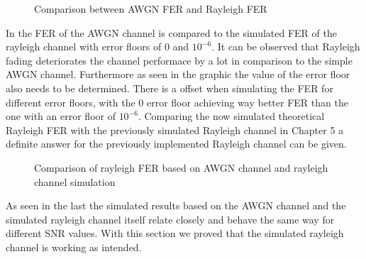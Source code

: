 \begin{figure}[!h]
	\setlength{}
	\setlength\fheight{0.4\textheight}
	\centering
	
	\caption{Comparison between AWGN FER and Rayleigh FER}
	\label{fig:FERAWGNRAY}
\end{figure}
\newpage
In  the \gls{FER} of the AWGN channel is compared to the simulated \gls{FER} of the rayleigh channel with error floors of $0$ and $10^{-6}$. It can be observed that Rayleigh fading deteriorates the channel performace by a lot in comparison to the simple AWGN channel. Furthermore as seen in the graphic the value of the error floor also needs to be determined. There is a offset when simulating the \gls{FER} for different error floors, with the 0 error floor achieving way better \gls{FER} than the one with an error floor of $10^{-6}$. Comparing the now simulated theoretical Rayleigh \gls{FER} with the previously simulated Rayleigh channel in Chapter 5 a definite answer for the previously implemented Rayleigh channel can be given.
\newpage
\begin{figure}[!htb]
	\setlength{}
	\setlength\fheight{0.4\textheight}
	\centering
	
	\caption{Comparison of rayleigh FER based on AWGN channel and rayleigh channel simulation}
	\label{fig:AWGNRAYCOMP}
\end{figure}
As seen in the last  the simulated results based on the AWGN channel and the simulated rayleigh channel itself relate closely and behave the same way for different \gls{SNR} values. With this section we proved that the simulated rayleigh channel is working as intended. 

\clearpage

